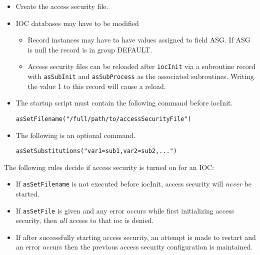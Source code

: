 \begin{itemize}
\item Create the access security file.
\item IOC databases may have to be modified

\begin{itemize}
\item Record instances may have to have values assigned to field ASG.
If ASG is null the record is in group DEFAULT.

\item Access security files can be reloaded after \verb|iocInit| via a subroutine record with \verb|asSubInit| and 
\verb|asSubProcess| as the associated subroutines.
Writing the value 1 to this record will cause a reload.

\end {itemize}

\item The startup script must contain the following command before iocInit.

\begin{verbatim}
asSetFilename("/full/path/to/accessSecurityFile")
\end{verbatim}

\item The following is an optional command.

\begin{verbatim}
asSetSubstitutions("var1=sub1,var2=sub2,...")
\end{verbatim}
\end{itemize}

The following rules decide if access security is turned on for an IOC:

\begin{itemize}
\item If \verb|asSetFilename| is not executed before iocInit, access security will \emph{never} be started.

\item If \verb|asSetFile| is given and any error occurs while first initializing access security, then \emph{all} access to that ioc is denied.

\item If after successfully starting access security, an attempt is made to restart and an error occurs then the previous 
access security configuration is maintained.
\end{itemize}

